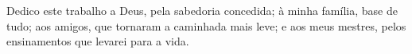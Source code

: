 Dedico este trabalho a Deus, pela sabedoria concedida; à minha família, base de
tudo; aos amigos, que tornaram a caminhada mais leve; e aos meus mestres, pelos
ensinamentos que levarei para a vida.
